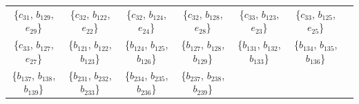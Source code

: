 \documentclass[%
  reprint,
  superscriptaddress,
  showpacs,
  showkeys,
  amsmath,amssymb,
  pra,
  longbibliography,
  floatfix,
  x11names
]{revtex4-2}
\begin{document}
\begin{table}[htbp!]
\begin{ruledtabular}
\begin{tabular}{ccccccc}
\{$c_{31}$, $b_{129}$, $e_{29}$\} & \{$c_{32}$, $b_{122}$, $e_{22}$\} & \{$c_{32}$, $b_{124}$, $e_{24}$\} & \{$c_{32}$, $b_{128}$, $e_{28}$\} & \{$c_{33}$, $b_{123}$, $e_{23}$\} & \{$c_{33}$, $b_{125}$, $e_{25}$\} \\
\{$c_{33}$, $b_{127}$, $e_{27}$\} & \{$b_{121}$, $b_{122}$, $b_{123}$\} & \{$b_{124}$, $b_{125}$, $b_{126}$\} & \{$b_{127}$, $b_{128}$, $b_{129}$\} & \{$b_{131}$, $b_{132}$, $b_{133}$\} & \{$b_{134}$, $b_{135}$, $b_{136}$\} \\
\{$b_{137}$, $b_{138}$, $b_{139}$\} & \{$b_{231}$, $b_{232}$, $b_{233}$\} & \{$b_{234}$, $b_{235}$, $b_{236}$\} & \{$b_{237}$, $b_{238}$, $b_{239}$\} & & \\
\end{tabular}
\end{ruledtabular}
\end{table}
\end{document}
